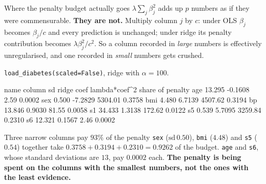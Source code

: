 \documentclass[aspectratio=169]{beamer}
\begin{document}
\begin{frame}[fragile,shrink=10]{Where the penalty budget actually goes}
$\lambda\sum_j\beta_j^2$ adds up $p$ numbers as if they were commensurable.
\textbf{They are not.} Multiply column $j$ by $c$: under OLS $\beta_j$ becomes
$\beta_j/c$ and every prediction is unchanged; under ridge its penalty
contribution becomes $\lambda\beta_j^2/c^2$. So a column recorded in
\emph{large} numbers is effectively unregularised, and one recorded in
\emph{small} numbers gets crushed.

\texttt{load\_diabetes(scaled=False)}, ridge with $\alpha = 100$.
\begin{outblk}
     name    column sd    ridge coef   lambda*coef^2   share of penalty
     age       13.295       -0.1608            2.59         0.0002
     sex        0.500       -7.2829         5304.01         0.3758
     bmi        4.480        6.7139         4507.62         0.3194
     bp        13.846        0.9030           81.55         0.0058
     s1        34.433        1.3138          172.62         0.0122
     s5         0.539        5.7095         3259.84         0.2310
     s6        12.321        0.1567            2.46         0.0002
\end{outblk}
\begin{alertblock}{Three narrow columns pay $93\%$ of the penalty}
  \footnotesize \texttt{sex} ($\mathrm{sd}\,0.50$), \texttt{bmi}
  ($4.48$) and \texttt{s5} ($0.54$) together take
  $0.3758 + 0.3194 + 0.2310 = \mathbf{0.9262}$ of the budget.
  \texttt{age} and \texttt{s6}, whose standard deviations are $13$, pay
  $0.0002$ each. \textbf{The penalty is being spent on the columns with the
  smallest numbers, not the ones with the least evidence.}
\end{alertblock}
\end{frame}
\end{document}
